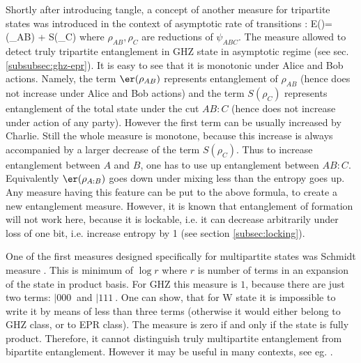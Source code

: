 \documentclass[rmp,12pt,preprint]{revtex4-2}
\begin{document}
Shortly after introducing tangle, a concept of another measure
for tripartite states was introduced in the context of asymptotic
rate of transitions \cite{LPSW1999}:
\be
E(\psi)=\er(\rho_{AB}) + S(\rho_C)
\ee
where $\rho_{AB},\rho_C$ are reductions of $\psi_{ABC}$.
The measure allowed to detect truly tripartite
entanglement in GHZ state in asymptotic regime (see sec. \ref{subsubsec:ghz-epr}).
It is easy to see that it is monotonic under Alice and Bob actions.
Namely, the term $\er(\rho_{AB})$ represents entanglement of $\rho_{AB}$
(hence does not increase under Alice and Bob actions)
and the term $S(\rho_C)$ represents entanglement of the total
state under the cut $AB:C$ (hence does not increase under action of any party).
However the first term can be usually increased by Charlie.
Still the whole measure is monotone, because this increase is always
accompanied by a larger decrease of the term $S(\rho_C)$.
Thus to increase entanglement between $A$ and $B$,
one has to use up entanglement between $AB:C$.
Equivalently $\er(\rho_{A:B})$ goes down under mixing less than the entropy
goes up. Any measure having this feature can be put to the above formula,
to create a new entanglement measure. However, it is known that entanglement
of formation will not work here, because it is lockable, i.e. it can decrease
arbitrarily under loss of one bit, i.e. increase entropy by 1 (see section
\ref{subsec:locking}).

One of the first measures designed specifically for multipartite
states was Schmidt measure \cite{EisertB2000-Schmidt}. This
is minimum of $\log r$ where $r$ is number of terms in an expansion
of the state in product basis. For GHZ this measure is $1$, because
there are just two terms: $|000\>$ and $|111\>$. One can show, that
for W state it is impossible to write it by means of less than three
terms (otherwise it would either belong to GHZ class, or to EPR
class).
The measure is zero if and only if the state is fully product.
Therefore, it cannot distinguish truly multipartite entanglement from
bipartite entanglement. However it may be useful in many contexts,
see eg. \cite{MoraB2005-compl-ent}.
\end{document}
